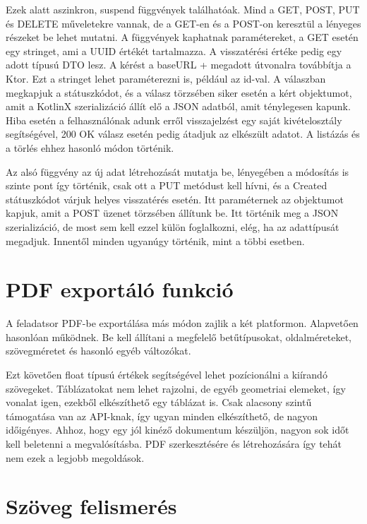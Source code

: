 Ezek alatt aszinkron, suspend függvények találhatóak. Mind a GET, POST, PUT és DELETE műveletekre vannak, de a GET-en és a POST-on keresztül a lényeges részeket be lehet mutatni.
A függvények kaphatnak paramétereket, a GET esetén egy stringet, ami a UUID értékét tartalmazza.
A visszatérési értéke pedig egy adott típusú DTO lesz.
A kérést a baseURL + megadott útvonalra továbbítja a Ktor. Ezt a stringet lehet paraméterezni is, például az id-val.
A válaszban megkapjuk a státuszkódot, és a válasz törzsében siker esetén a kért objektumot, amit a KotlinX szerializáció állít elő a JSON adatból, amit ténylegesen kapunk.
Hiba esetén a felhasználónak adunk erről visszajelzést egy saját kivételosztály segítségével, 200 OK válasz esetén pedig átadjuk az elkészült adatot.
A listázás és a törlés ehhez hasonló módon történik.

Az alsó függvény az új adat létrehozását mutatja be, lényegében a módosítás is szinte pont így történik, csak ott a PUT metódust kell hívni, és a Created státuszkódot várjuk helyes visszatérés esetén.
Itt paraméternek az objektumot kapjuk, amit a POST üzenet törzsében állítunk be. Itt történik meg a JSON szerializáció, de most sem kell ezzel külön foglalkozni, elég, ha az adattípusát megadjuk.
Innentől minden ugyanúgy történik, mint a többi esetben.

\section{PDF exportáló funkció}
\label{sec:PDF}

A feladatsor PDF-be exportálása más módon zajlik a két platformon. 
Alapvetően hasonlóan működnek.
Be kell állítani a megfelelő betűtípusokat, oldalméreteket, szövegméretet és hasonló egyéb változókat.

Ezt követően float típusú értékek segítségével lehet pozícionálni a kiírandó szövegeket.
Táblázatokat nem lehet rajzolni, de egyéb geometriai elemeket, így vonalat igen, ezekből elkészíthető egy táblázat is.
Csak alacsony szintű támogatása van az API-knak, így ugyan minden elkészíthető, de nagyon időigényes.
Ahhoz, hogy egy jól kinéző dokumentum készüljön, nagyon sok időt kell beletenni a megvalósításba.
PDF szerkesztésére és létrehozására így tehát nem ezek a legjobb megoldások.

\section{Szöveg felismerés}
\label{sec:TextRec}

